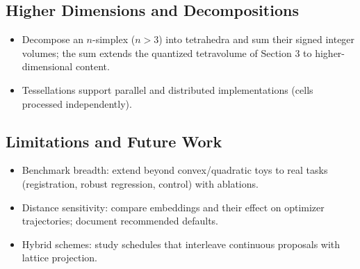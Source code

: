 \documentclass[
  10pt,
]{article}
\providecommand{\tightlist}{%
  \setlength{\itemsep}{0pt}\setlength{\parskip}{0pt}}
\begin{document}
\subsection{Higher Dimensions and
Decompositions}\label{higher-dimensions-and-decompositions}

\begin{itemize}
\tightlist
\item
  Decompose an \(n\)-simplex (\(n > 3\)) into tetrahedra and sum their
  signed integer volumes; the sum extends the quantized tetravolume of
  Section 3 to higher-dimensional content.
\item
  Tessellations support parallel and distributed implementations (cells
  processed independently).
\end{itemize}

\subsection{Limitations and Future
Work}\label{limitations-and-future-work}

\begin{itemize}
\tightlist
\item
  Benchmark breadth: extend beyond convex/quadratic toys to real tasks
  (registration, robust regression, control) with ablations.
\item
  Distance sensitivity: compare embeddings and their effect on optimizer
  trajectories; document recommended defaults.
\item
  Hybrid schemes: study schedules that interleave continuous proposals
  with lattice projection.
\end{itemize}
\end{document}
